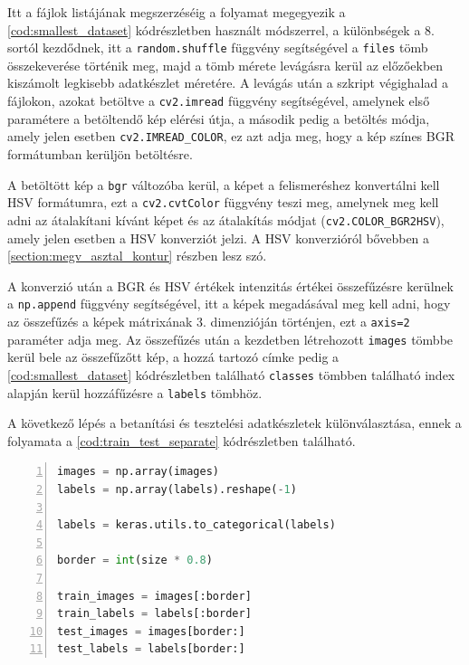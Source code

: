 \par Itt a fájlok listájának megszerzéséig a folyamat megegyezik a \ref{cod:smallest_dataset} kódrészletben használt módszerrel, a különbségek a 8. sortól kezdődnek, itt a \lstinline{random.shuffle} függvény segítségével a \lstinline{files} tömb összekeverése történik meg, majd a tömb mérete levágásra kerül az előzőekben kiszámolt legkisebb adatkészlet méretére. A levágás után a szkript végighalad a fájlokon, azokat betöltve a \lstinline{cv2.imread} függvény\cite{opencv_docs} segítségével, amelynek első paramétere a betöltendő kép elérési útja, a második pedig a betöltés módja, amely jelen esetben \lstinline{cv2.IMREAD_COLOR}, ez azt adja meg, hogy a kép színes BGR formátumban kerüljön betöltésre.
\par A betöltött kép a \lstinline{bgr} változóba kerül, a képet a felismeréshez konvertálni kell HSV formátumra, ezt a \lstinline{cv2.cvtColor} függvény teszi meg, amelynek meg kell adni az átalakítani kívánt képet és az átalakítás módjat (\lstinline{cv2.COLOR_BGR2HSV}), amely jelen esetben a HSV konverziót jelzi. A HSV konverzióról bővebben a \ref{section:megv_asztal_kontur} részben lesz szó.
\par A konverzió után a BGR és HSV értékek intenzitás értékei összefűzésre kerülnek a \lstinline{np.append} függvény segítségével, itt a képek megadásával meg kell adni, hogy az összefűzés a képek mátrixának 3. dimenzióján történjen, ezt a \lstinline{axis=2} paraméter adja meg. Az összefűzés után a kezdetben létrehozott \lstinline{images} tömbbe kerül bele az összefűzőtt kép, a hozzá tartozó címke pedig a \ref{cod:smallest_dataset} kódrészletben található \lstinline{classes} tömbben található index alapján kerül hozzáfűzésre a \lstinline{labels} tömbhöz.
\par A következő lépés a betanítási és tesztelési adatkészletek különválasztása, ennek a folyamata a \ref{cod:train_test_separate} kódrészletben található.

\begin{codewrapper}
\begin{lstlisting}[language=Python, numbers=left, caption={A tanítási és tesztelési adatkészletek elkülönítése.}, label={cod:train_test_separate}]
images = np.array(images)
labels = np.array(labels).reshape(-1)

labels = keras.utils.to_categorical(labels)

border = int(size * 0.8)

train_images = images[:border]
train_labels = labels[:border]
test_images = images[border:]
test_labels = labels[border:]
\end{lstlisting}
\end{codewrapper}

